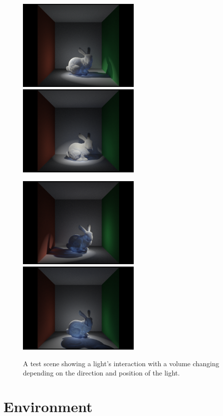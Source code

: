 \documentclass[12pt]{ucthesis}
\newcommand{\captionfonts}{\small\bf\ssp}
\begin{document}
\begin{figure}[h!]
\centering
    \includegraphics[width=60mm]{img/bunny_spot/spot_left.png}
    \includegraphics[width=60mm]{img/bunny_spot/spot_front.png}

    \includegraphics[width=60mm]{img/bunny_spot/spot_right.png}
    \includegraphics[width=60mm]{img/bunny_spot/spot_behind.png}
    \captionfonts
    \caption{A test scene showing a light's interaction with a volume changing depending on the direction and position of the light.}
\end{figure}

\section{Environment}
\end{document}
